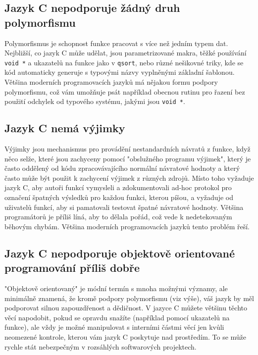 \documentclass{article}
\begin{document}
	\subsection*{Jazyk C nepodporuje žádný druh polymorfismu}
	
	Polymorfismus je schopnost funkce pracovat s více než jedním typem dat. Nejbližší, co jazyk C může udělat, jsou parametrizované makra, těžké používání \texttt{void *} a ukazatelů na funkce jako v \texttt{qsort}, nebo různé nešikovné triky, kde se kód automaticky generuje s typovými názvy vyplněnými základní šablonou. Většina moderních programovacích jazyků má nějakou formu podpory polymorfismu, což vám umožňuje psát například obecnou rutinu pro řazení bez použití odchylek od typového systému, jakými jsou \texttt{void *}.
	
	\subsection*{Jazyk C nemá výjimky}
	
	Výjimky jsou mechanismus pro provádění nestandardních návratů z funkce, když něco selže, které jsou zachyceny pomocí "obslužného programu výjimek", který je často oddělený od kódu zpracovávajícího normální návratové hodnoty a který často může být použit k zachycení výjimek z různých zdrojů. Místo toho vyžaduje jazyk C, aby autoři funkcí vymysleli a zdokumentovali ad-hoc protokol pro označení špatných výsledků pro každou funkci, kterou píšou, a vyžaduje od uživatelů funkcí, aby si pamatovali testovat špatné návratové hodnoty. Většina programátorů je příliš líná, aby to dělala pořád, což vede k nedetekovaným běhovým chybám. Většina moderních programovacích jazyků tento problém řeší.
	
	\subsection*{Jazyk C nepodporuje objektově orientované programování příliš dobře}
	
	"Objektově orientovaný" je módní termín s mnoha možnými významy, ale minimálně znamená, že kromě podpory polymorfismu (viz výše), váš jazyk by měl podporovat silnou zapouzdřenost a dědičnost. V jazyce C můžete většinu těchto věcí napodobit, pokud se opravdu snažíte (například pomocí ukazatelů na funkce), ale vždy je možné manipulovat s interními částmi věcí jen kvůli neomezené kontrole, kterou vám jazyk C poskytuje nad prostředím. To se může rychle stát nebezpečným v rozsáhlých softwarových projektech.
	
\end{document}
